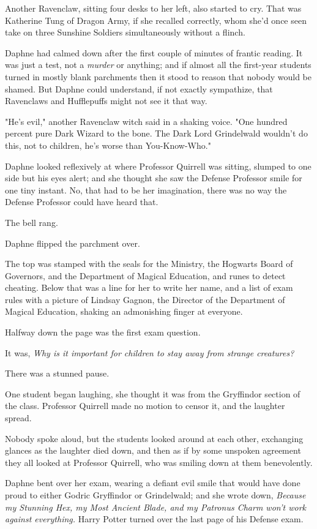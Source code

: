 Another Ravenclaw, sitting four desks to her left, also started to cry. That
was Katherine Tung of Dragon Army, if she recalled correctly, whom she'd once
seen take on three Sunshine Soldiers simultaneously without a flinch.

Daphne had calmed down after the first couple of minutes of frantic reading. It
was just a test, not a \emph{murder} or anything; and if almost all the
first-year students turned in mostly blank parchments then it stood to reason
that nobody would be shamed. But Daphne could understand, if not exactly
sympathize, that Ravenclaws and Hufflepuffs might not see it that way.

"He's evil," another Ravenclaw witch said in a shaking voice. "One hundred
percent pure Dark Wizard to the bone. The Dark Lord Grindelwald wouldn't do
this, not to children, he's worse than You-Know-Who."

Daphne looked reflexively at where Professor Quirrell was sitting, slumped to
one side but his eyes alert; and she thought she saw the Defense Professor
smile for one tiny instant. No, that had to be her imagination, there was no
way the Defense Professor could have heard that.

The bell rang.

Daphne flipped the parchment over.

The top was stamped with the seals for the Ministry, the Hogwarts Board of
Governors, and the Department of Magical Education, and runes to detect
cheating. Below that was a line for her to write her name, and a list of exam
rules with a picture of Lindsay Gagnon, the Director of the Department of
Magical Education, shaking an admonishing finger at everyone.

Halfway down the page was the first exam question.

It was, \emph{Why is it important for children to stay away from strange
creatures?}

There was a stunned pause.

One student began laughing, she thought it was from the Gryffindor section of
the class. Professor Quirrell made no motion to censor it, and the laughter
spread.

Nobody spoke aloud, but the students looked around at each other, exchanging
glances as the laughter died down, and then as if by some unspoken agreement
they all looked at Professor Quirrell, who was smiling down at them
benevolently.

Daphne bent over her exam, wearing a defiant evil smile that would have done
proud to either Godric Gryffindor or Grindelwald; and she wrote down,
\emph{Because my Stunning Hex, my Most Ancient Blade, and my Patronus Charm
won't work against everything.}
\sbreak
Harry Potter turned over the last page of his Defense exam.

